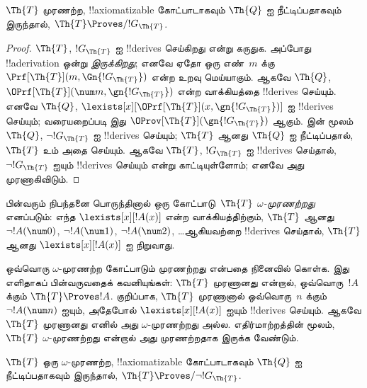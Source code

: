 \documentclass[../../../include/open-logic-section]{subfiles}
\begin{document}
\begin{lem}
$\Th{T}$ முரணற்ற, !!{axiomatizable} கோட்பாடாகவும்
$\Th{Q}$ ஐ நீட்டிப்பதாகவும் இருந்தால்,
$\Th{T} \Proves/ !G_\Th{T}$.
\end{lem}

\begin{proof}
$\Th{T}$, $!G_\Th{T}$ ஐ !!{derive}s செய்கிறது என்று கருதுக.
அப்போது !!a{derivation} ஒன்று \emph{இருக்கிறது}; எனவே ஏதோ ஒரு
எண்~$m$ க்கு $\Prf[\Th{T}](m,\Gn{!G_\Th{T}})$ என்ற உறவு
மெய்யாகும். ஆகவே $\Th{Q}$,
$\OPrf[\Th{T}](\num m, \gn{!G_\Th{T}})$ என்ற வாக்கியத்தை
!!{derive}s செய்யும். எனவே $\Th{Q}$,
$\lexists[x][\OPrf[\Th{T}](x,\gn{!G_\Th{T}})]$ ஐ
!!{derive}s செய்யும்; வரையறைப்படி இது
$\OProv[\Th{T}](\gn{!G_\Th{T}})$ ஆகும்.  இன்
மூலம் $\Th{Q}$, $\lnot !G_\Th{T}$ ஐ !!{derive}s செய்யும்;
$\Th{T}$ ஆனது $\Th{Q}$ ஐ நீட்டிப்பதால், $\Th{T}$ உம் அதை
செய்யும். ஆகவே $\Th{T}$, $!G_\Th{T}$ ஐ !!{derive}s
செய்தால், $\lnot !G_\Th{T}$ ஐயும் !!{derive}s செய்யும் என்று
காட்டியுள்ளோம்; எனவே அது முரணாகிவிடும்.
\end{proof}

\begin{defn}
பின்வரும் நிபந்தனை பொருந்தினால் ஒரு கோட்பாடு~$\Th{T}$
\emph{$\omega$-முரணற்றது} எனப்படும்: எந்த
$\lexists[x][!A(x)]$ என்ற வாக்கியத்திற்கும், $\Th{T}$ ஆனது
$\lnot !A(\num 0)$, $\lnot !A(\num 1)$, $\lnot !A(\num 2)$,
\dots ஆகியவற்றை !!{derive}s செய்தால், $\Th{T}$ ஆனது
$\lexists[x][!A(x)]$ ஐ நிறுவாது.
\end{defn}

ஒவ்வொரு $\omega$-முரணற்ற கோட்பாடும் முரணற்றது என்பதை நினைவில்
கொள்க. இது எளிதாகப் பின்வருவதைக் கவனியுங்கள்: $\Th{T}$ முரணானது
என்றால், ஒவ்வொரு~$!A$ க்கும் $\Th{T} \Proves !A$. குறிப்பாக,
$\Th{T}$ முரணானால் ஒவ்வொரு~$n$ க்கும்
$\lnot !A(\num n)$ ஐயும், அதேபோல்
$\lexists[x][!A(x)]$ ஐயும் !!{derive}s செய்யும். ஆகவே $\Th{T}$
முரணானது எனில் அது $\omega$-முரணற்றது அல்ல. எதிர்மாற்றத்தின்
மூலம், $\Th{T}$ $\omega$-முரணற்றது என்றால் அது முரணற்றதாக
இருக்க வேண்டும்.

\begin{lem}
$\Th{T}$ ஒரு $\omega$-முரணற்ற, !!{axiomatizable} கோட்பாடாகவும்
$\Th{Q}$ ஐ நீட்டிப்பதாகவும் இருந்தால்,
$\Th{T} \Proves/ \lnot !G_\Th{T}$.
\end{lem}
\end{document}
